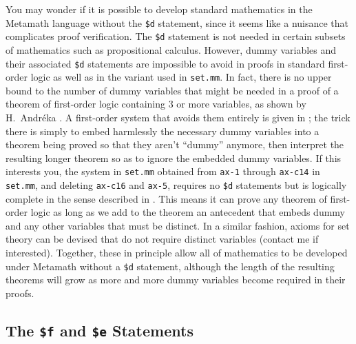 \label{nodd}
You may wonder if it is possible to develop standard
mathematics in the Metamath language without the \texttt{\$d} statement, since it seems like a nuisance that complicates proof
verification. The \texttt{\$d} statement is not needed in certain subsets of
mathematics such as propositional calculus.  However, dummy
variables and their associated \texttt{\$d}
statements are impossible to avoid in proofs in standard first-order logic as
well as in the variant used in \texttt{set.mm}.  In fact, there is no upper bound to
the number of dummy variables that might be needed in a proof of a theorem of
first-order logic containing 3 or more variables, as shown by H.\
Andr\'{e}ka \cite{Nemeti}.  A first-order system that
avoids them entirely is given in \cite{Megill}\index{Megill, Norman}; the
trick there is simply to embed harmlessly the necessary dummy variables into a
theorem being proved so that they aren't ``dummy'' anymore, then interpret the
resulting longer theorem so as to ignore the embedded dummy variables.  If
this interests you, the system in \texttt{set.mm} obtained from \texttt{ax-1}
through \texttt{ax-c14} in \texttt{set.mm}, and deleting \texttt{ax-c16} and \texttt{ax-5},
requires no \texttt{\$d} statements but is logically complete in the sense
described in \cite{Megill}.  This means it can prove any theorem of
first-order logic as long as we add to the theorem an antecedent that embeds
dummy and any other variables that must be distinct.  In a similar fashion,
axioms for set theory can be devised that do not require distinct variables
(contact me if
interested).
Together, these in principle allow all of
mathematics to be developed under Metamath without a \texttt{\$d} statement,
although the length of the resulting theorems will grow as more and
more dummy variables become required in their proofs.

\subsection{The \texttt{\$f}
and \texttt{\$e} Statements}\label{dollaref}

